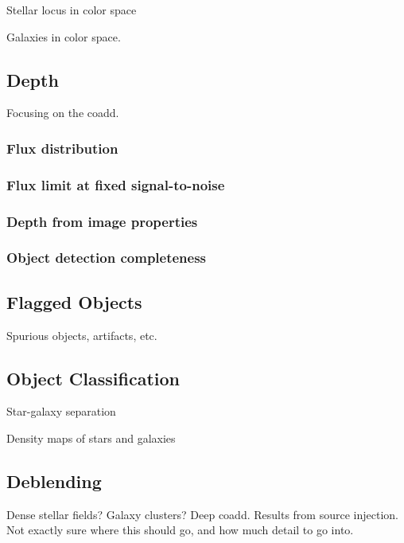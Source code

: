 Stellar locus in color space

Galaxies in color space.

\subsection{Depth}

Focusing on the coadd.

\subsubsection{Flux distribution}

\subsubsection{Flux limit at fixed signal-to-noise}

\subsubsection{Depth from image properties}

\subsubsection{Object detection completeness}


\subsection{Flagged Objects}

Spurious objects, artifacts, etc.

\subsection{Object Classification}

Star-galaxy separation

Density maps of stars and galaxies

\subsection{Deblending}

Dense stellar fields? Galaxy clusters? Deep coadd. Results from source injection.
Not exactly sure where this should go, and how much detail to go into.

